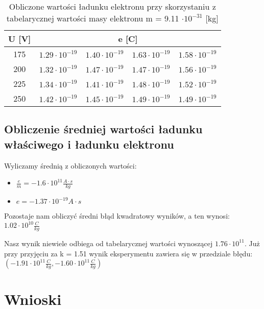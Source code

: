 \documentclass{article}
\begin{document}
\begin{table}[htbp]
\centering
\begin{tabular}{|c|r|r|r|r|}
\hline
U [V] & \multicolumn{4}{|c|}{e [C]} \\ \hline
175 & $1.29 \cdot 10^{-19}$ & $1.40 \cdot 10^{-19}$ & $1.63 \cdot 10^{-19}$ & $1.58 \cdot 10^{-19}$ \\ \hline
200 & $1.32 \cdot 10^{-19}$ &$1.47 \cdot 10^{-19}$ & $1.47 \cdot 10^{-19}$ & $1.56 \cdot 10^{-19}$ \\ \hline
225 & $1.34 \cdot 10^{-19}$ & $1.41 \cdot 10^{-19}$ & $1.48 \cdot 10^{-19}$ & $1.52 \cdot 10^{-19}$ \\ \hline
250 & $1.42 \cdot 10^{-19}$ & $1.45 \cdot 10^{-19}$ & $1.49 \cdot 10^{-19}$ & $1.49 \cdot 10^{-19}$ \\ \hline
\end{tabular}
\caption{Obliczone wartości ładunku elektronu przy skorzystaniu z tabelarycznej wartości masy elektronu m = 9.11 $\cdot 10^{-31}$ [kg]}
\label{}
\end{table}

\subsection{Obliczenie średniej wartości ładunku właściwego i ładunku elektronu}

Wyliczamy średnią z obliczonych wartości:
\begin{itemize}
\item $\frac{e}{m} = -1.6 \cdot 10^{11} \frac{A \cdot s}{kg}$
\item $e = -1.37 \cdot 10^{-19} A \cdot s$
\end{itemize}

Pozostaje nam obliczyć średni błąd kwadratowy wyników, a ten wynosi: $1.02 \cdot 10^{10} \frac{C}{kg}$

Nasz wynik niewiele odbiega od tabelarycznej wartości wynoszącej $1.76 \cdot 10^{11}$. Już przy przyjęciu za k = 1.51 wynik eksperymentu zawiera się w przedziale błędu: $(-1.91 \cdot 10^{11} \frac{C}{kg}, -1.60 \cdot 10^{11} \frac{C}{kg})$

\section{Wnioski}
\end{document}
